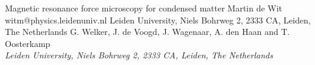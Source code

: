 \begin{conf-abstract}[]
{Magnetic resonance force microscopy for condensed matter}
{\color{blue} Martin de Wit}
{witm@physics.leidenuniv.nl}
{Leiden University, Niels Bohrweg 2, 2333 CA, Leiden, The Netherlands}
{{\color{blue}G. Welker, J. de Voogd, J. Wagenaar, A. den Haan and T. Oosterkamp}\\ \textit{Leiden University, Niels Bohrweg 2, 2333 CA, Leiden, The Netherlands}\\ 
\decofourleft \decofourright}





\printbibliography[heading=none]

\end{conf-abstract}
